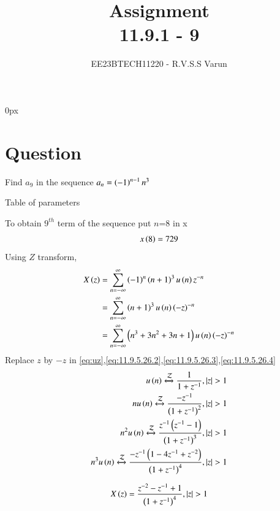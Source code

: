 \documentclass[journal,12pt,twocolumn]{IEEEtran}
\theoremstyle{remark}
\begin{document}
\parindent 0px


\title{Assignment\\[1ex]11.9.1 - 9}
\author{EE23BTECH11220 - R.V.S.S Varun$^{}$%
}
\maketitle
\newpage
\bigskip

\renewcommand{\thefigure}{\theenumi}
\renewcommand{\thetable}{\theenumi}
\section*{Question}
Find $a_{9}$ in the sequence $a_{n}=\left(-1\right)^{n-1}n^{3}$ 
\fi

\begin{table}[h]
    \centering
   
    
    \caption{Table of parameters}
    \label{tab:11.9.1.9.1}
\end{table}


To obtain $9^{th}$ term of the sequence put $n$=8 in x
\begin{align}
x\left(8\right)=729
\end{align}
Using $Z$ transform,
\begin{align}
	X\left(z\right)&=\sum_{n=-\infty}^{\infty}\left(-1\right)^n\left(n+1\right)^3u\left(n\right)z^{-n}\\
	&=\sum_{n=-\infty}^{\infty}\left(n+1\right)^3u\left(n\right)\left(-z\right)^{-n}\\
	&=\sum_{n=-\infty}^{\infty}\left(n^3+3n^2+3n+1\right)u\left(n\right)\left(-z\right)^{-n}
\end{align}
Replace $z$ by $-z$ in \eqref{eq:uz},\eqref{eq:11.9.5.26.2},\eqref{eq:11.9.5.26.3},\eqref{eq:11.9.5.26.4}
\begin{align}
	u\left(n\right)\xleftrightarrow{\mathcal{Z}}\frac{1}{1+z^{-1}},\left\vert z\right\vert>1\\
	nu\left(n\right)\xleftrightarrow{\mathcal{Z}}\frac{-z^{-1}}{\left(1+z^{-1}\right)^2},\left\vert z\right\vert>1\\
	n^2u\left(n\right)\xleftrightarrow{\mathcal{Z}}\frac{z^{-1}\left(z^{-1}-1\right)}{\left(1+z^{-1}\right)^3},\left\vert z\right\vert>1\\
	n^3u\left(n\right)\xleftrightarrow{\mathcal{Z}}\frac{-z^{-1}\left(1-4z^{-1}+z^{-2}\right)}{\left(1+z^{-1}\right)^4},\left\vert z\right\vert>1
\end{align}

\begin{align}
	X\left(z\right)=\frac{z^{-2}-z^{-1}+1}{\left(1+z^{-1}\right)^4},\left\vert z\right\vert>1
\end{align}
\end{document}
